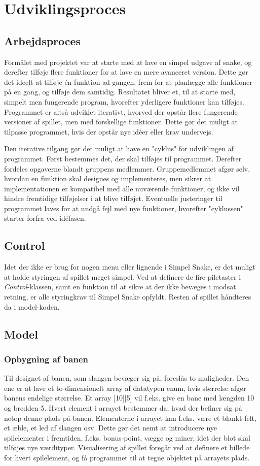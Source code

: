 \section{Udviklingsproces}
\subsection{Arbejdsproces}
Formålet med projektet var at starte med at lave en simpel udgave af snake, og derefter tilføje flere funktioner for at lave en mere avanceret version. Dette gør det ideelt at tilføje én funktion ad gangen, frem for at planlægge alle funktioner på en gang, og tilføje dem samtidig. Resultatet bliver et, til at starte med, simpelt men fungerende program, hvorefter yderligere funktioner kan tilføjes. Programmet er altså udviklet iterativt, hvorved der opstår flere fungerende versioner af spillet, men med forskellige funktioner. Dette gør det muligt at tilpasse programmet, hvis der opstår nye idéer eller krav undervejs. 

Den iterative tilgang gør det muligt at have en "cyklus" for udviklingen af programmet. Først bestemmes det, der skal tilføjes til programmet. Derefter fordeles opgaverne blandt gruppens medlemmer. Gruppemedlemmet afgør selv, hvordan en funktion skal designes og implementeres, men sikrer at implementationen er kompatibel med alle nuværende funktioner, og ikke vil hindre fremtidige tilføjelser i at blive tilføjet. Eventuelle justeringer til programmet laves for at undgå fejl med nye funktioner, hvorefter "cyklussen" starter forfra ved idéfasen.

\subsection{Control}
Idet der ikke er brug for nogen menu eller lignende i Simpel Snake, er det muligt at holde styringen af spillet meget simpel. Ved at definere de fire piletaster i \textit{Control}-klassen, samt en funktion til at sikre at der ikke bevæges i modsat retning, er alle styringkrav til Simpel Snake opfyldt. Resten af spillet håndteres da i model-koden.

\subsection{Model}
\subsubsection{Opbygning af banen}
Til designet af banen, som slangen bevæger sig på, foreslås to muligheder. Den ene er at lave et to-dimensionelt array af datatypen enum, hvis størrelse afgør banens endelige størrelse. Et array [10][5] vil f.eks. give en bane med længden 10 og bredden 5. Hvert element i arrayet bestemmer da, hvad der befiner sig på netop denne plads på banen. Elementerne i arrayet kan f.eks. være et blankt felt, et æble, et led af slangen osv. Dette gør det nemt at introducere nye spilelementer i fremtiden, f.eks. bonus-point, vægge og miner, idet der blot skal tilføjes nye værdityper. Visualisering af spillet foregår ved at definere et billede for hvert spilelement, og få programmet til at tegne objektet på arrayets plads.

